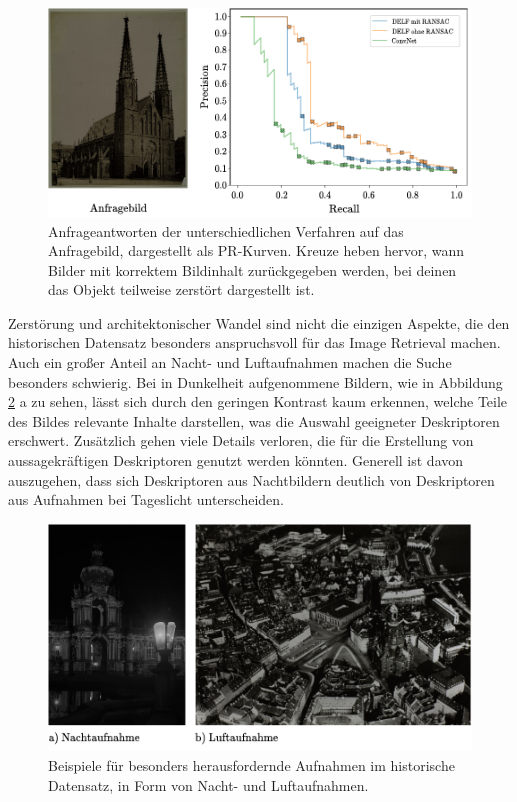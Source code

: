 \\
\begin{figure}[h]
\centering
\includegraphics[scale=1.0]{destruction_pr}
\caption{Anfrageantworten der unterschiedlichen Verfahren auf das Anfragebild, dargestellt als PR-Kurven. Kreuze heben hervor, wann Bilder mit korrektem Bildinhalt zurückgegeben werden, bei deinen das Objekt teilweise zerstört dargestellt ist.}
\label{destruction_pr}
\end{figure}
Zerstörung und architektonischer Wandel sind nicht die einzigen Aspekte, die den historischen Datensatz besonders anspruchsvoll für das Image Retrieval machen. Auch ein großer Anteil an Nacht- und Luftaufnahmen machen die Suche besonders schwierig. Bei in Dunkelheit aufgenommene Bildern, wie in Abbildung \ref{example_night_aerial} a zu sehen, lässt sich durch den geringen Kontrast kaum erkennen, welche Teile des Bildes relevante Inhalte darstellen, was die Auswahl geeigneter Deskriptoren erschwert. Zusätzlich gehen viele Details verloren, die für die Erstellung von aussagekräftigen Deskriptoren genutzt werden könnten. Generell ist davon auszugehen, dass sich Deskriptoren aus Nachtbildern deutlich von Deskriptoren aus Aufnahmen bei Tageslicht unterscheiden. 
\begin{figure}[h]
\centering
\includegraphics[scale=1.0]{example_night_aerial}
\caption{Beispiele für besonders herausfordernde Aufnahmen im historische Datensatz, in Form von Nacht- und Luftaufnahmen.}
\label{example_night_aerial}
\end{figure}
